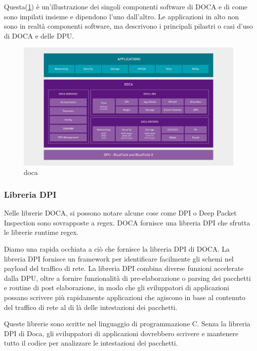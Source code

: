 \documentclass[binding=0.6cm]{sapthesis}
\theoremstyle{definition}
\begin{document}
Questa(\ref{fig:doca}) è un'illustrazione dei singoli componenti software di DOCA e di come sono impilati 
insieme e dipendono l'uno dall'altro. Le applicazioni in alto non sono in realtà componenti
software, ma descrivono i principali pilastri o casi d'uso di DOCA e delle DPU.
\begin{figure}[H]
    \includegraphics[width=\textwidth]{doca}
    \caption{doca}
    \label{fig:doca}
\end{figure}

\subsubsection*{Libreria DPI}

Nelle librerie DOCA, si possono notare alcune cose come DPI o Deep Packet Inspection 
sono sovrapposte a regex. DOCA fornisce una libreria DPI che sfrutta le librerie runtime regex.

Diamo una rapida occhiata a ciò che fornisce 
la libreria DPI di DOCA. La libreria DPI fornisce un framework per identificare facilmente gli 
schemi nel payload del traffico di rete. La libreria DPI combina diverse funzioni accelerate dalla
DPU, oltre a fornire funzionalità di pre-elaborazione o parsing dei pacchetti e routine di 
post elaborazione, in modo che gli sviluppatori di applicazioni possano scrivere più rapidamente 
applicazioni che agiscono in base al contenuto del traffico di rete al di là delle intestazioni 
dei pacchetti.

Queste librerie sono scritte nel linguaggio di programmazione C. 
Senza la libreria DPI di Doca, gli sviluppatori di applicazioni dovrebbero scrivere e 
mantenere tutto il codice per analizzare le intestazioni dei pacchetti.

\end{document}
